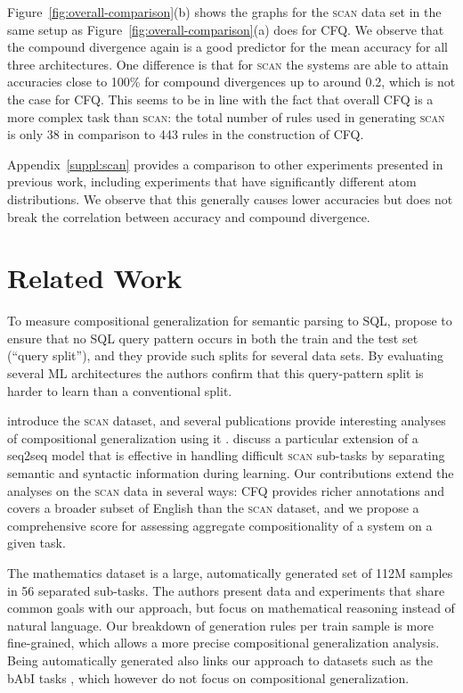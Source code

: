\documentclass[letterpaper]{article}
\newcommand{\SCAN}{\textsc{scan}}
\begin{document}
Figure~\ref{fig:overall-comparison}(b) shows the graphs for the \SCAN{} data set in the same setup as Figure~\ref{fig:overall-comparison}(a) does for CFQ. We observe that the compound divergence again is a good predictor for the mean accuracy for all three architectures. One difference is that for \SCAN{} the systems are able to attain accuracies close to 100\% for compound divergences up to around 0.2, which is not the case for CFQ. This seems to be in line with the fact that overall CFQ is a more complex task than \SCAN{}: the total number of rules used in generating \SCAN{} is only 38 in comparison to 443 rules in the construction of CFQ.

Appendix~\ref{suppl:scan} provides a comparison to other experiments presented in previous work, including experiments that have significantly different atom distributions. We observe that this generally causes lower accuracies but does not break the correlation between accuracy and compound divergence.

\section{Related Work}
\label{sect:relwork}

To measure compositional generalization for semantic parsing to SQL, \citet{ACL2018sql} propose to ensure that no SQL query pattern occurs in both the train and the test set (``query split''), and they provide such splits for several data sets. By evaluating several ML architectures the authors confirm that this query-pattern split is harder to learn than a conventional split.

\citet{Lake2018GeneralizationWS} introduce the \SCAN{} dataset, and several publications provide interesting analyses of compositional generalization using it \citep{bastings2018jump,rearranging}. 
\citet{YBcomp2019} discuss a particular extension of a seq2seq model that is effective in handling difficult \SCAN{} sub-tasks by separating semantic and syntactic information during learning. 
Our contributions extend the analyses on the \SCAN{} data in several ways: CFQ provides richer annotations and covers a broader subset of English than the \SCAN{} dataset, and we propose a comprehensive score for assessing aggregate compositionality of a system on a given task.

The mathematics dataset \citep{saxton2019mathematics} is a large, automatically generated set of 112M samples in 56 separated sub-tasks. The authors present data and experiments that share common goals with our approach, but focus on mathematical reasoning instead of natural language. Our breakdown of generation rules per train sample is more fine-grained, which allows a more precise compositional generalization analysis.
Being automatically generated also links our approach to datasets such as the bAbI tasks \citep{weston2016babi}, which however do not focus on compositional generalization.
\end{document}
